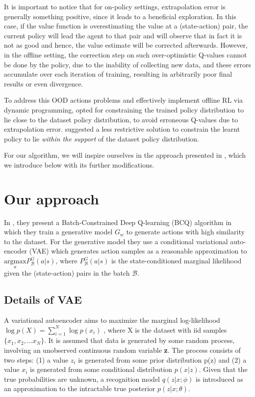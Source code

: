 It is important to notice that for on-policy settings, extrapolation error is generally something positive, since it
leads to a beneficial exploration. In this case, if the value function is overestimating the value at
a (state-action) pair, the current policy will lead the agent to that pair and will observe that in fact
it is not as good and hence, the value estimate will be corrected afterwards.
However, in the offline setting, the correction step on such over-optimistic Q-values cannot be done by the 
policy, due to the inability of collecting new data, and these errors accumulate over each iteration of training,
resulting in arbitrarily poor final results or even divergence.


To address this OOD actions problems and effectively implement offline RL via dynamic programming,
\citet{Fujimoto2018} opted for constraining the trained policy distribution to lie close to
the dataset policy distribution, to avoid erroneous Q-values due to extrapolation error.
\citet{Kumar2019} suggested a less restrictive solution to constrain the learnt policy to lie
\textit{within the support} of the dataset policy distribution.

For our algorithm, we will inspire ourselves in the approach presented in 
\citet{Fujimoto2019}, which we introduce below with its further modifications.


\section{Our approach} 
In \citet{Fujimoto2019}, they present a Batch-Constrained Deep Q-learning (BCQ)
algorithm in which they
train a generative model $G_w$ to generate actions with high similarity to the dataset.
For the generative model they use a conditional variational auto-encoder (VAE) \cite{Kingma2014} which
generates action samples as a reasonable approximation to
$\underset{a}{\text{argmax}}  P _\mathcal{B}^G(a|s)$, where $P_\mathcal{B}^G(a|s)$ is 
the state-conditioned marginal likelihood given the (state-action) pairs in the 
batch $\mathcal{B}$.

\subsection{Details of VAE}

A variational autoencoder aims to maximize the marginal log-likelihood $\log p(X) = \sum_{i=1}^{N}\log p(x_i)$
, where X is the dataset with iid samples $\{x_{1},x_2,...x_N\}$.
It is assumed that data is generated by some random process, involving an unobserved continuous
random variable \textbf{z}.
The process consists of two steps: (1) a value \textbf{$z_i$} is generated from some prior distribution p(z) and (2)
a value $x_i$ is generated from some conditional distribution $p(x|z)$.
Given that the true probabilities are unknown, a recognition model $q(z|x; \phi )$ is introduced
as an approximation to the intractable true posterior $p(z|x; \theta)$.

